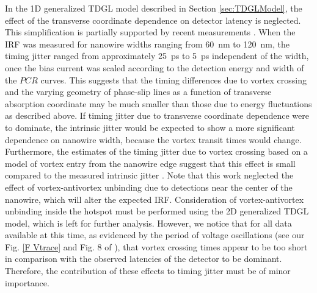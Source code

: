 \documentclass[%
reprint,
 amsmath,amssymb,
aps,
pra,
]{revtex4-1}
\begin{document}
\quad In the 1D generalized TDGL model described in Section \ref{sec:TDGLModel}, the effect of the transverse coordinate dependence on detector latency is neglected.  This simplification is partially supported by recent measurements \cite{korzh_demonstrating_2018}.  When the IRF was measured for nanowire widths ranging from 60~nm to 120~nm, the timing jitter ranged from approximately 25~ps to 5~ps independent of the width, once the bias current was scaled according to the detection energy and width of the $PCR$ curves.  This suggests that the timing differences due to vortex crossing and the varying geometry of phase-slip lines as a function of transverse absorption coordinate may be much smaller than those due to energy fluctuations as described above.  If timing jitter due to transverse coordinate dependence were to dominate, the intrinsic jitter would be expected to show a more significant dependence on nanowire width, because the vortex transit times would change.  Furthermore, the estimates of the timing jitter due to vortex crossing based on a model of vortex entry from the nanowire edge suggest that this effect is small compared to the measured intrinsic jitter \cite{wu_vortex-crossing-induced_2017}.  Note that this work neglected the effect of vortex-antivortex unbinding due to detections near the center of the nanowire, which will alter the expected IRF. Consideration of vortex-antivortex unbinding inside the hotspot must be performed using the 2D generalized TDGL model, which is left for further analysis. However, we notice that for all data available at this time, as evidenced by the period of voltage oscillations (see our Fig. \ref{F Vtrace} and Fig. 8 of \cite{vodolazov_single-photon_2017}), that vortex crossing times appear to be too short in comparison with the observed latencies of the detector to be dominant. Therefore, the contribution of these effects to timing jitter must be of minor importance. 
\end{document}

